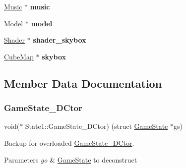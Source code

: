 \begin{DoxyCompactItemize}
\begin{tabbing}
\end{tabbing}\item 
\mbox{\label{struct_state1_ab0d137104296eef922a4e9250f7600fd}} 
\mbox{\hyperlink{struct_music}{Music}} $\ast$ {\bfseries music}
\item 
\mbox{\label{struct_state1_a161fc4ee722042f4c5547a32142aa17d}} 
\mbox{\hyperlink{struct_model}{Model}} $\ast$ {\bfseries model}
\item 
\mbox{\label{struct_state1_ae7678c2688f1e46a60d7b88f3859e604}} 
\mbox{\hyperlink{struct_shader}{Shader}} $\ast$ {\bfseries shader\+\_\+skybox}
\item 
\mbox{\label{struct_state1_aed509eee756121e37187d0a2448a43db}} 
\mbox{\hyperlink{struct_cube_map}{Cube\+Map}} $\ast$ {\bfseries skybox}
\end{DoxyCompactItemize}


\subsection{Member Data Documentation}
\mbox{\label{struct_state1_a89d8206dc3ee03810adff69d2bcce383}} 
\subsubsection{\texorpdfstring{GameState\_DCtor}{GameState\_DCtor}}
{\footnotesize\ttfamily void($\ast$ State1\+::\+Game\+State\+\_\+\+D\+Ctor) (struct \mbox{\hyperlink{struct_game_state}{Game\+State}} $\ast$gs)}



Backup for overloaded \mbox{\hyperlink{struct_state1_a89d8206dc3ee03810adff69d2bcce383}{Game\+State\+\_\+\+D\+Ctor}}. 


\begin{DoxyParams}{Parameters}
{\em go} & \mbox{\hyperlink{struct_game_state}{Game\+State}} to deconstruct \\
\hline
\end{DoxyParams}
\mbox{\label{struct_state1_a37f8f5351b463bde341c3f485fea341e}} 
